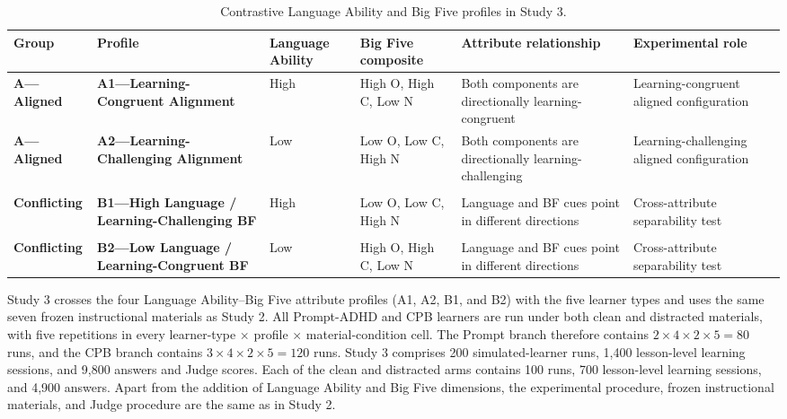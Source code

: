 \begin{table}[H]
\centering
\caption{Contrastive Language Ability and Big Five profiles in Study 3.}
\label{tab:study3-attribute-profiles}
\scriptsize
\setlength{\tabcolsep}{3pt}
\renewcommand{\arraystretch}{1.18}
\begin{tabularx}{\textwidth}{>{\raggedright\arraybackslash}p{}>{\raggedright\arraybackslash}p{}>{\raggedright\arraybackslash}p{}>{\raggedright\arraybackslash}p{}>{\raggedright\arraybackslash}X>{\raggedright\arraybackslash}p{}}
\toprule
\textbf{Group} & \textbf{Profile} & \textbf{Language Ability} & \textbf{Big Five composite} & \textbf{Attribute relationship} & \textbf{Experimental role} \\
\midrule
\textbf{A---Aligned} & \textbf{A1---Learning-Congruent Alignment} & High & High O, High C, Low N & Both components are directionally learning-congruent & Learning-congruent aligned configuration \\
\textbf{A---Aligned} & \textbf{A2---Learning-Challenging Alignment} & Low & Low O, Low C, High N & Both components are directionally learning-challenging & Learning-challenging aligned configuration \\
\makecell[l]{\textbf{B---}\\\textbf{Conflicting}} & \textbf{B1---High Language / Learning-Challenging BF} & High & Low O, Low C, High N & Language and BF cues point in different directions & Cross-attribute separability test \\
\makecell[l]{\textbf{B---}\\\textbf{Conflicting}} & \textbf{B2---Low Language / Learning-Congruent BF} & Low & High O, High C, Low N & Language and BF cues point in different directions & Cross-attribute separability test \\
\bottomrule
\end{tabularx}
\end{table}

Study 3 crosses the four Language Ability--Big Five attribute profiles (A1, A2, B1, and B2) with the five learner types and uses the same seven frozen instructional materials as Study 2. All Prompt-ADHD and CPB learners are run under both clean and distracted materials, with five repetitions in every learner-type $\times$ profile $\times$ material-condition cell. The Prompt branch therefore contains $2\times4\times2\times5=80$ runs, and the CPB branch contains $3\times4\times2\times5=120$ runs. Study 3 comprises 200 simulated-learner runs, 1,400 lesson-level learning sessions, and 9,800 answers and Judge scores. Each of the clean and distracted arms contains 100 runs, 700 lesson-level learning sessions, and 4,900 answers. Apart from the addition of Language Ability and Big Five dimensions, the experimental procedure, frozen instructional materials, and Judge procedure are the same as in Study 2.

